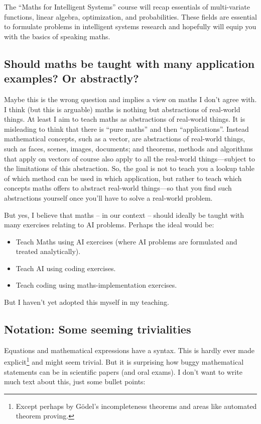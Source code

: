 The ``Maths for Intelligent Systems'' course will recap essentials of
multi-variate functions, linear algebra, optimization, and probabilities. These
fields are essential to formulate problems in intelligent
systems research and hopefully will equip you with the basics of
speaking maths.

\subsection{Should maths be taught with many application examples? Or
abstractly?}

Maybe this is the wrong question and implies a view on maths I don't
agree with. I think (but this is arguable) maths is nothing but
abstractions of real-world things. At least I aim to teach maths as
abstractions of real-world things. It is misleading to think that
there is ``pure maths'' and then ``applications''. Instead
mathematical concepts, such as a vector, are abstractions of
real-world things, such as faces, scenes, images, documents; and
theorems, methods and algorithms that apply on vectors of course also
apply to all the real-world things---subject to the limitations of
this abstraction. So, the goal is not to teach you a lookup table of
which method can be used in which application, but rather to teach
which concepts maths offers to abstract real-world things---so that
you find such abstractions yourself once you'll have to solve a
real-world problem.

But yes, I believe that maths -- in our context -- should ideally be taught with many exercises relating to AI problems. Perhaps the ideal would be:
\begin{itemize}
\item Teach Maths using AI exercises (where AI problems are formulated and treated analytically).
\item Teach AI using coding exercises.
\item Teach coding using maths-implementation exercises.
\end{itemize}
But I haven't yet adopted this myself in my teaching.


\subsection{Notation: Some seeming trivialities}

Equations and mathematical expressions have a syntax. This is hardly
ever made explicit\footnote{Except perhaps by G{\"o}del's incompleteness
theorems and areas like automated theorem proving.} and might seem
trivial. But it is surprising how buggy mathematical statements can be
in scientific papers (and oral exams). I don't want to write much text
about this, just some bullet points:

